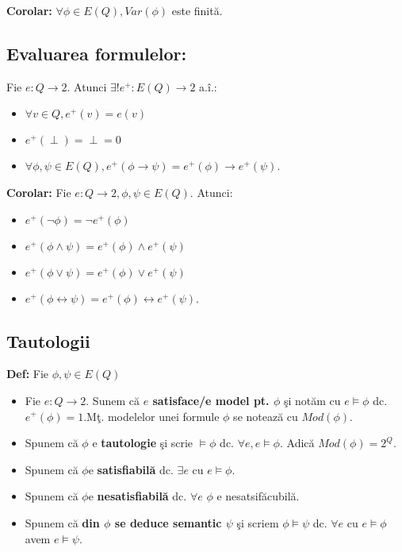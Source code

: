 \documentclass{article}
\begin{document}
\textbf{Corolar:} $\forall\phi\in E(Q), Var(\phi)$ este finit\u a.

\subsection{Evaluarea formulelor:} Fie $e:Q\rightarrow 2$. Atunci $\exists! e^+:E(Q)\rightarrow 2$ a.\^ i.:
\begin{itemize}
    \item $\forall v\in Q, e^+(v)=e(v)$
    \item $e^+(\perp)=\perp=0$
    \item $\forall \phi,\psi\in E(Q),e^+(\phi\rightarrow\psi)=e^+(\phi)\rightarrow e^+(\psi)$.
\end{itemize}

\textbf{Corolar:} Fie $e:Q\rightarrow 2,\phi,\psi\in E(Q)$. Atunci:
\begin{itemize}
    \item $e^+(\neg\phi)=\neg e^+(\phi)$
    \item $e^+(\phi\land\psi)=e^+(\phi)\land e^+(\psi)$
    \item $e^+(\phi\lor\psi)=e^+(\phi)\lor e^+(\psi)$
    \item $e^+(\phi\leftrightarrow\psi)=e^+(\phi)\leftrightarrow e^+(\psi)$.
\end{itemize}

\subsection{Tautologii}

\textbf{Def:} Fie $\phi,\psi\in E(Q)$
\begin{itemize}
    \item Fie $e:Q\rightarrow 2$. Sunem c\u a \textbf{$e$ satisface/e model pt. $\phi$} \c si not\u am cu $e\models \phi$ dc. $e^+(\phi)=1$.M\c t. modelelor unei formule $\phi$ se noteaz\u a cu $Mod(\phi)$.
    \item Spunem c\u a $\phi$ e \textbf{tautologie} \c si scrie $\models\phi$ dc. $\forall e, e\models\phi$. Adic\u a $Mod(\phi)=2^Q$.
    \item Spunem c\u a $\phi$e \textbf{satisfiabil\u a} dc. $\exists e$ cu $e\models \phi$.
    \item Spunem c\u a $\phi$e \textbf{nesatisfiabil\u a} dc. $\forall e$ $\phi$ e nesatsif\u acubil\u a.
    \item Spunem c\u a \textbf{din $\phi$ se deduce semantic $\psi$} \c si scriem $\phi\models\psi$ dc. $\forall e$ cu $e\models\phi$ avem $e\models\psi$.
\end{itemize}
\end{document}
